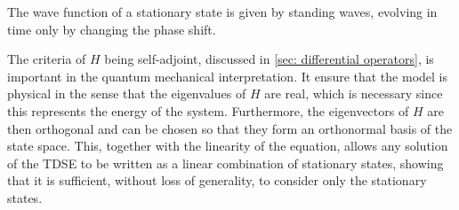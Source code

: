 The wave function of a stationary state is given by standing waves, evolving in time only by changing the phase shift.

The criteria of $H$ being self-adjoint, discussed in \ref{sec: differential operators}, is important in the quantum mechanical interpretation. It ensure that the model is physical in the sense that the eigenvalues of $H$ are real, which is necessary since this represents the energy of the system. Furthermore, the eigenvectors of $H$ are then orthogonal and can be chosen so that they form an orthonormal basis of the state space. This, together with the linearity of the equation, allows any solution of the TDSE to be written as a linear combination of stationary states, showing that it is sufficient, without loss of generality, to consider only the stationary states.


